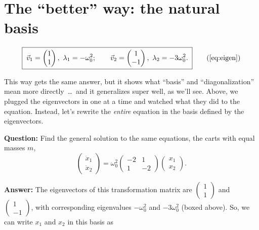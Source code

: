 \documentclass[12pt]{article}
\numberwithin{equation}{section}
\newcommand{\wo}{\omega_0}
\begin{document}
\newpage
\section{The ``better'' way: the natural basis}
\label{sec:way2}

\begin{equation*}
  \boxed{\;\vec{v}_1 = \begin{pmatrix} 1 \\ 1 \end{pmatrix},\ \lambda_1 = -\wo^2;
  \qquad
  \vec{v}_2 = \begin{pmatrix} 1 \\ -1 \end{pmatrix},\ \lambda_2 = -3\wo^2.\;}
  \tag{\ref*{eq:eigen}}
\end{equation*}

\medskip

\noindent This way gets the same answer, but it shows what ``basis'' and
``diagonalization'' mean more directly~\ldots\ and it generalizes super well, as
we'll see. Above, we plugged the eigenvectors in one at a time and watched
what they did to the equation. Instead, let's rewrite the \emph{entire}
equation in the basis defined by the eigenvectors.

\medskip

\noindent\textbf{Question:} Find the general solution to the same
equations, the carts with equal masses $m$,
\begin{equation*}
  \begin{pmatrix} \ddot{x}_1 \\ \ddot{x}_2 \end{pmatrix}
  = \wo^2 \begin{pmatrix} -2 & 1 \\ 1 & -2 \end{pmatrix}
  \begin{pmatrix} x_1 \\ x_2 \end{pmatrix}.
\end{equation*}

\noindent\textbf{Answer:} The eigenvectors of this transformation matrix
are $\left(\begin{smallmatrix} 1 \\ 1 \end{smallmatrix}\right)$ and
$\left(\begin{smallmatrix} 1 \\ -1 \end{smallmatrix}\right)$, with
corresponding eigenvalues $-\wo^2$ and $-3\wo^2$ (boxed above). So, we
can write $x_1$ and $x_2$ in this basis as
\end{document}
